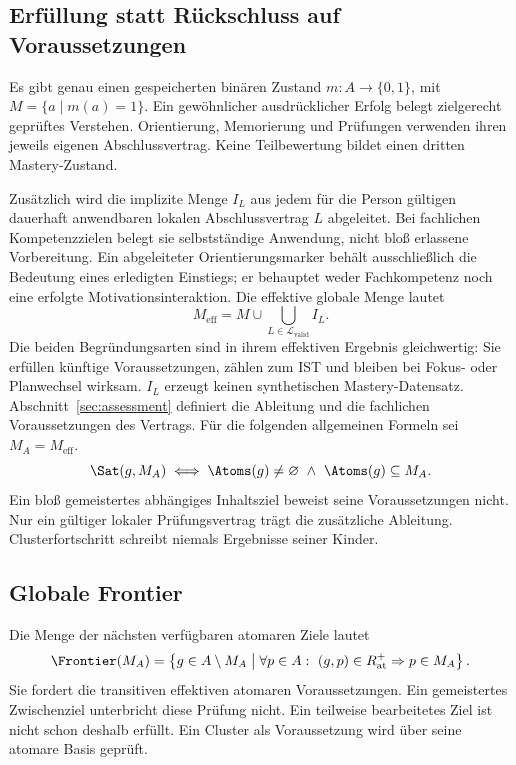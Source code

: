 \subsection{Erfüllung statt Rückschluss auf Voraussetzungen}
Es gibt genau einen gespeicherten binären Zustand $m:A\to\{0,1\}$,
mit $M=\{a\mid m(a)=1\}$. Ein gewöhnlicher ausdrücklicher Erfolg belegt
zielgerecht geprüftes Verstehen. Orientierung, Memorierung und Prüfungen
verwenden ihren jeweils eigenen Abschlussvertrag. Keine Teilbewertung
bildet einen dritten Mastery-Zustand.

Zusätzlich wird die implizite Menge $I_L$ aus jedem für die Person
gültigen dauerhaft anwendbaren lokalen Abschlussvertrag $L$ abgeleitet. Bei fachlichen Kompetenzzielen belegt sie selbstständige Anwendung,
nicht bloß erlassene Vorbereitung. Ein abgeleiteter Orientierungsmarker
behält ausschließlich die Bedeutung eines erledigten Einstiegs; er
behauptet weder Fachkompetenz noch eine erfolgte Motivationsinteraktion. Die effektive globale Menge lautet
\[
 M_{\mathrm{eff}}=M\cup\bigcup_{L\in\mathcal L_{\mathrm{valid}}}I_L.
\]
Die beiden Begründungsarten sind in ihrem effektiven Ergebnis gleichwertig:
Sie erfüllen künftige Voraussetzungen, zählen zum IST und bleiben bei
Fokus- oder Planwechsel wirksam. $I_L$ erzeugt keinen synthetischen
Mastery-Datensatz. Abschnitt~\ref{sec:assessment} definiert die Ableitung
und die fachlichen Voraussetzungen des Vertrags.
Für die folgenden allgemeinen Formeln sei $M_A=M_{\mathrm{eff}}$.
\begin{equation}
 \Sat(g,M_A)\iff
 \Atoms(g)\ne\varnothing\ \land\ \Atoms(g)\subseteq M_A.
 \label{eq:sat}
\end{equation}
Ein bloß gemeistertes abhängiges Inhaltsziel beweist seine Voraussetzungen
nicht. Nur ein gültiger lokaler Prüfungsvertrag trägt die zusätzliche
Ableitung. Clusterfortschritt schreibt niemals Ergebnisse seiner Kinder.

\subsection{Globale Frontier}
Die Menge der nächsten verfügbaren atomaren Ziele lautet
\begin{equation}
 \Frontier(M_A)=\left\{g\in A\setminus M_A\;\middle|\;
 \forall p\in A:\ (g,p)\in R_{\mathrm{at}}^+\Rightarrow p\in M_A\right\}.
 \label{eq:frontier}
\end{equation}
Sie fordert die transitiven effektiven atomaren Voraussetzungen. Ein
gemeistertes Zwischenziel unterbricht diese Prüfung nicht. Ein teilweise
bearbeitetes Ziel ist nicht schon deshalb erfüllt. Ein Cluster als
Voraussetzung wird über seine atomare Basis geprüft.

